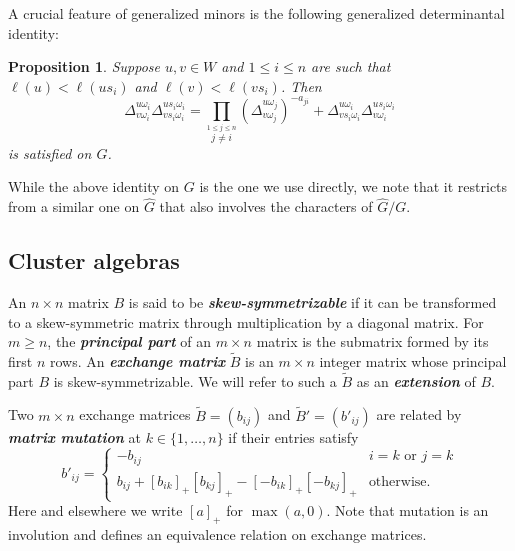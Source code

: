\documentclass[12pt]{amsart}
\newcommand{\sayDR}[1]{\say[DR]{\color{red}{\bf DR:}\;#1}}
\newcommand{\newword}[1]{\textbf{\emph{#1}}}
\newtheorem{proposition}[theorem]{Proposition}
\theoremstyle{remark}
\numberwithin{equation}{section}
\numberwithin{figure}{section}
\begin{document}
A crucial feature of generalized minors is the following generalized determinantal identity:

\begin{proposition}\cite{FZ99,Wil13}
  \label{prop:fundid}
  Suppose $u,v \in W$ and $1 \leq i \leq n$ are such that $\ell(u)<\ell(us_i)$ and $\ell(v)<\ell(vs_i)$.
  Then
  \begin{equation}
    \label{eq:fundid}
    \Delta_{v\omega_i}^{u\omega_i} \Delta_{vs_i\omega_i}^{us_i\omega_i}
    =
    \prod_{\stackrel{1\leq j \leq n}{j\neq i}}\left(\Delta_{v\omega_j}^{u\omega_j}\right)^{-a_{ji}}
    +
    \Delta_{vs_i\omega_i}^{u\omega_i} \Delta_{v\omega_i}^{us_i\omega_i}
  \end{equation}
  is satisfied on $G$.%
\end{proposition}

While the above identity on $G$ is the one we use directly, we note that it restricts from a similar one on $\widehat{G}$ that also involves the characters of $\widehat{G}/G$.

\subsection{Cluster algebras}
\label{sec:clusteralgebras}
An $n\times n$ matrix $B$ is said to be \newword{skew-symmetrizable} if it can be transformed to a skew-symmetric matrix through multiplication by a diagonal matrix.
For $m \geq n$, the \newword{principal part} of an $m \times n$ matrix is the submatrix formed by its first $n$ rows.
An \newword{exchange matrix} $\widetilde B$ is an $m\times n$ integer matrix whose principal part $B$ is skew-symmetrizable.
We will refer to such a $\widetilde B$ as an \newword{extension} of $B$.

Two $m\times n$ exchange matrices $\widetilde B=(b_{ij})$ and $\widetilde B'=(b'_{ij})$ are related by \newword{matrix mutation} at $k \in \{1,\dotsc,n\}$ if their entries satisfy
\begin{equation}
\label{eq:matrix mutation}
  b'_{ij} = \begin{cases}
  -b_{ij} & i = k \text{ or } j = k\\
  b_{ij} + [b_{ik}]_+ [b_{kj}]_+ - [-b_{ik}]_+ [-b_{kj}]_+ & \text{otherwise.}
  \end{cases}
\end{equation}
Here and elsewhere we write $[a]_+$ for $\max(a,0)$.
Note that mutation is an involution and defines an equivalence relation on exchange matrices.
\end{document}
